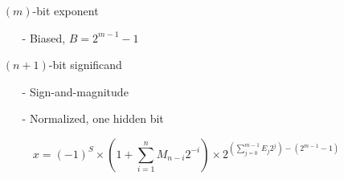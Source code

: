 \documentclass[12pt,openany, tikz,border=10pt]{book}
\begin{document}
			      	\begin{itemize}
			      		\item[] $(m)$-bit exponent
			      		      \begin{itemize}
			      		      	\item[-] Biased, $B = 2^{m-1} - 1$
			      		      \end{itemize}
			      		\item[] $(n + 1)$-bit significand
			      		      \begin{itemize}
			      		      	\item[-] Sign-and-magnitude
			      		      	\item[-] Normalized, one hidden bit
			      		      \end{itemize}
			      		      
			      	\end{itemize}
			      	
			      	\[
			      		x = (-1)^S \times \left(1 + \sum_{i=1}^{n} M_{n-i}2^{-i} \right) \times 2^{\left(\sum_{j=0}^{m-1} E_j2^j\right) - (2^{m-1} - 1)}
			      	\]
\end{document}
